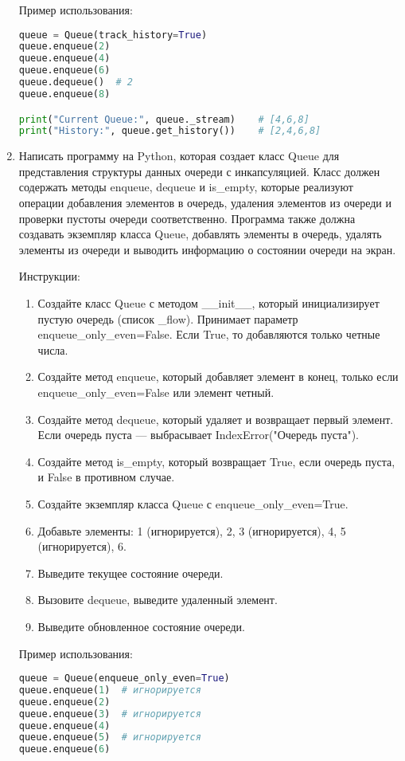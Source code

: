 \begin{enumerate}
Пример использования:
\begin{lstlisting}[language=Python]
queue = Queue(track_history=True)
queue.enqueue(2)
queue.enqueue(4)
queue.enqueue(6)
queue.dequeue()  # 2
queue.enqueue(8)

print("Current Queue:", queue._stream)    # [4,6,8]
print("History:", queue.get_history())    # [2,4,6,8]
\end{lstlisting}

\item Написать программу на Python, которая создает класс Queue для представления структуры данных очереди с инкапсуляцией. Класс должен содержать методы enqueue, dequeue и is\_empty, которые реализуют операции добавления элементов в очередь, удаления элементов из очереди и проверки пустоты очереди соответственно. Программа также должна создавать экземпляр класса Queue, добавлять элементы в очередь, удалять элементы из очереди и выводить информацию о состоянии очереди на экран.

Инструкции:
\begin{enumerate}
    \item Создайте класс Queue с методом \_\_init\_\_, который инициализирует пустую очередь (список \_flow). Принимает параметр enqueue\_only\_even=False. Если True, то добавляются только четные числа.
    \item Создайте метод enqueue, который добавляет элемент в конец, только если enqueue\_only\_even=False или элемент четный.
    \item Создайте метод dequeue, который удаляет и возвращает первый элемент. Если очередь пуста — выбрасывает IndexError("Очередь пуста").
    \item Создайте метод is\_empty, который возвращает True, если очередь пуста, и False в противном случае.
    \item Создайте экземпляр класса Queue с enqueue\_only\_even=True.
    \item Добавьте элементы: 1 (игнорируется), 2, 3 (игнорируется), 4, 5 (игнорируется), 6.
    \item Выведите текущее состояние очереди.
    \item Вызовите dequeue, выведите удаленный элемент.
    \item Выведите обновленное состояние очереди.
\end{enumerate}

Пример использования:
\begin{lstlisting}[language=Python]
queue = Queue(enqueue_only_even=True)
queue.enqueue(1)  # игнорируется
queue.enqueue(2)
queue.enqueue(3)  # игнорируется
queue.enqueue(4)
queue.enqueue(5)  # игнорируется
queue.enqueue(6)


\end{lstlisting}
\end{enumerate}
